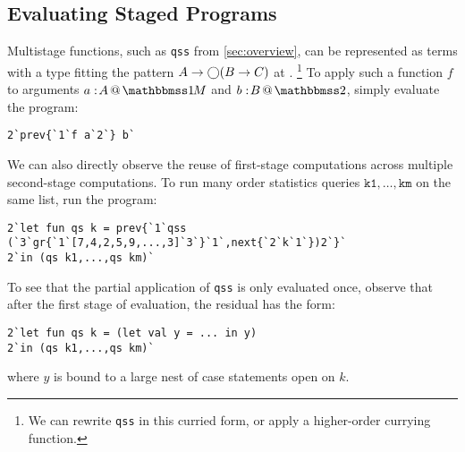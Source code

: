 \subsection{Evaluating Staged Programs}

Multistage functions, such as \texttt{qss} from \ref{sec:overview},
can be represented as terms with a type fitting the pattern \mbox{$A\to \bigcirc (B \to C)$} at \bbonem.%
\footnote{We can rewrite \texttt{qss} in this curried form, or apply a
higher-order currying function.} 
To apply such a function $f$ to arguments $\colmix a A$ and $\coltwo b B$, simply
evaluate the program:
\begin{lstlisting}
2`prev{`1`f a`2`} b`
\end{lstlisting}

We can also directly observe the reuse of first-stage computations across
multiple second-stage computations. To run many order statistics queries
$\texttt{k1},\dots,\texttt{km}$ on the same list, run the program:
\begin{lstlisting}
2`let fun qs k = prev{`1`qss (`3`gr{`1`[7,4,2,5,9,...,3]`3`}`1`,next{`2`k`1`})2`}`
2`in (qs k1,...,qs km)`
\end{lstlisting}
To see that the partial application of \texttt{qss} is only evaluated once,
observe that after the first stage of evaluation, the residual has the form:
\begin{lstlisting}
2`let fun qs k = (let val y = ... in y)
2`in (qs k1,...,qs km)`
\end{lstlisting}
where $y$ is bound to a large nest of case statements open on $k$.
